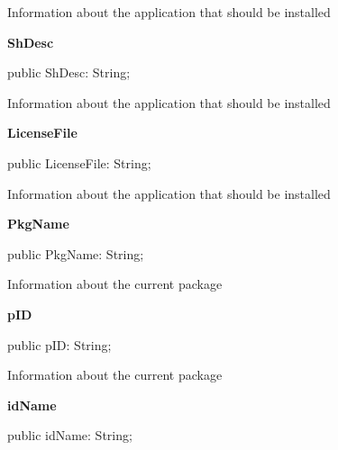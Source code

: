 \documentclass{report}
\newif\ifpdf
\begin{document}
\begin{list}{}
\begin{flushleft}
\ifpdf
\end{flushleft}
\fi


\par Information about the application that should be installed\label{mainunit.TIWizFrm-ShDesc}
\item[\textbf{ShDesc}\hfill]
\ifpdf
\begin{flushleft}
\fi
\begin{ttfamily}
public ShDesc: String;\end{ttfamily}

\ifpdf
\end{flushleft}
\fi


\par Information about the application that should be installed\label{mainunit.TIWizFrm-LicenseFile}
\item[\textbf{LicenseFile}\hfill]
\ifpdf
\begin{flushleft}
\fi
\begin{ttfamily}
public LicenseFile: String;\end{ttfamily}

\ifpdf
\end{flushleft}
\fi


\par Information about the application that should be installed\label{mainunit.TIWizFrm-PkgName}
\item[\textbf{PkgName}\hfill]
\ifpdf
\begin{flushleft}
\fi
\begin{ttfamily}
public PkgName: String;\end{ttfamily}

\ifpdf
\end{flushleft}
\fi


\par Information about the current package\label{mainunit.TIWizFrm-pID}
\item[\textbf{pID}\hfill]
\ifpdf
\begin{flushleft}
\fi
\begin{ttfamily}
public pID: String;\end{ttfamily}

\ifpdf
\end{flushleft}
\fi


\par Information about the current package\label{mainunit.TIWizFrm-idName}
\item[\textbf{idName}\hfill]
\ifpdf
\begin{flushleft}
\fi
\begin{ttfamily}
public idName: String;\end{ttfamily}


\end{flushleft}
\end{list}
\end{document}
